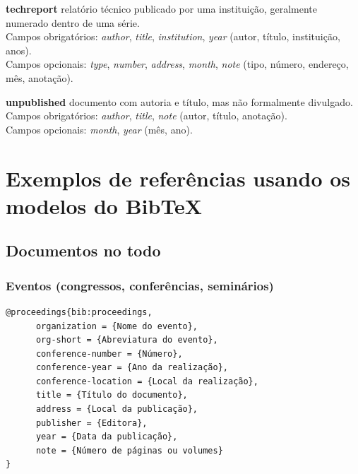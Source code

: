 \documentclass[a4paper,12pt,oneside,onecolumn,final,fleqn]{repUERJ}
\begin{document}
\begin{alinea}
\item [\textbf{techreport}] relatório técnico publicado por uma instituição, geralmente numerado dentro de uma série.\\
Campos obrigatórios: \textit{author}, \textit{title}, \textit{institution}, \textit{year} (autor, título, instituição, anos).\\
Campos opcionais: \textit{type}, \textit{number}, \textit{address}, \textit{month}, \textit{note} (tipo, número, endereço, mês, anotação).

\item [\textbf{unpublished}] documento com autoria e título, mas não formalmente divulgado.\\
Campos obrigatórios: \textit{author}, \textit{title}, \textit{note} (autor, título, anotação).\\
Campos opcionais: \textit{month}, \textit{year} (mês, ano).
\end{alinea}


\section{Exemplos de referências usando os modelos do \textsf{BibTeX}}

\subsection{Documentos no todo}

\subsubsection{Eventos (congressos, conferências, seminários)}

\noindent{}

\begin{verbatim}
@proceedings{bib:proceedings,
      organization = {Nome do evento},
      org-short = {Abreviatura do evento},
      conference-number = {Número},
      conference-year = {Ano da realização},
      conference-location = {Local da realização},
      title = {Título do documento},
      address = {Local da publicação},
      publisher = {Editora},
      year = {Data da publicação},
      note = {Número de páginas ou volumes}
}
\end{verbatim}
\end{document}

